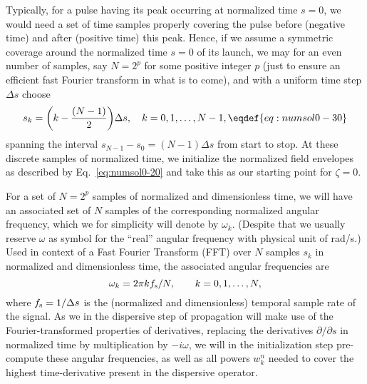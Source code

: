 Typically, for a pulse having its peak occurring at normalized time $s=0$, we
would need a set of time samples properly covering the pulse before (negative
time) and after (positive time) this peak. Hence, if we assume a symmetric
coverage around the normalized time $s=0$ of its launch, we may for an even
number of samples, say $N=2^p$ for some positive integer $p$ (just to ensure
an efficient fast Fourier transform in what is to come), and with a uniform
time step $\Delta s$
choose
$$
  s_k=\bigg(k-{{(N-1)}\over{2}}\bigg)\Delta s,\quad
  k=0,1,\ldots,N-1,
  \eqdef{eq:numsol0-30}
$$
spanning the interval $s_{N-1}-s_0=(N-1)\Delta s$ from start to stop.
At these discrete samples of normalized time, we initialize the normalized
field envelopes as described by Eq.~\eqref{eq:numsol0-20} and take this as
our starting point for $\zeta=0$.

For a set of $N=2^p$ samples of normalized and dimensionless time, we will have
an associated set of $N$ samples of the corresponding normalized angular
frequency, which we for simplicity will denote by $\omega_k$. (Despite that we
usually reserve $\omega$ as symbol for the ``real'' angular frequency with
physical unit of rad/s.)
Used in context of a Fast Fourier Transform (FFT) over $N$ samples $s_k$
in normalized and dimensionless time, the associated angular frequencies
are
$$
  \omega_k = 2\pi k f_{\rm s}/N,\qquad k=0,1,\ldots,N,
$$
where $f_{\rm s}=1/\Delta s$ is the (normalized and dimensionless) temporal
sample rate of the signal. As we in the dispersive step of propagation will
make use of the Fourier-transformed properties of derivatives, replacing the
derivatives $\partial/\partial s$ in normalized time by multiplication by
$-i\omega$, we will in the initialization step pre-compute these angular
frequencies, as well as all powers $w^n_k$ needed to cover the highest
time-derivative present in the dispersive operator.

